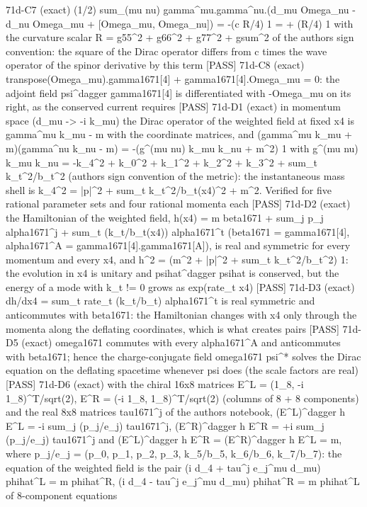 \documentclass[
  10pt,
]{article}
\newenvironment{Shaded}{}{}
\newcommand{\NormalTok}[1]{#1}
\begin{document}
\begin{Shaded}
\begin{Highlighting}[]
\NormalTok{[PASS] 71d{-}C7  (exact) (1/2) sum\_(mu nu) gamma\^{}mu.gamma\^{}nu.(d\_mu Omega\_nu {-} d\_nu Omega\_mu + [Omega\_mu, Omega\_nu]) = {-}(c R/4) 1 = + (R/4) 1 with the curvature scalar R = g55\^{}2 + g66\^{}2 + g77\^{}2 + gsum\^{}2 of the author\textquotesingle{}s sign convention: the square of the Dirac operator differs from c times the wave operator of the spinor derivative by this term}
\NormalTok{[PASS] 71d{-}C8  (exact) transpose(Omega\_mu).gamma1671[4] + gamma1671[4].Omega\_mu = 0: the adjoint field psi\^{}dagger gamma1671[4] is differentiated with {-}Omega\_mu on its right, as the conserved current requires}
\NormalTok{[PASS] 71d{-}D1  (exact) in momentum space (d\_mu {-}\textgreater{} {-}i k\_mu) the Dirac operator of the weighted field at fixed x4 is gamma\^{}mu k\_mu {-} m with the coordinate matrices, and (gamma\^{}mu k\_mu + m)(gamma\^{}nu k\_nu {-} m) = {-}(g\^{}(mu nu) k\_mu k\_nu + m\^{}2) 1 with g\^{}(mu nu) k\_mu k\_nu = {-}k\_4\^{}2 + k\_0\^{}2 + k\_1\^{}2 + k\_2\^{}2 + k\_3\^{}2 + sum\_t k\_t\^{}2/b\_t\^{}2 (author\textquotesingle{}s sign convention of the metric): the instantaneous mass shell is k\_4\^{}2 = |p|\^{}2 + sum\_t k\_t\^{}2/b\_t(x4)\^{}2 + m\^{}2. Verified for five rational parameter sets and four rational momenta each}
\NormalTok{[PASS] 71d{-}D2  (exact) the Hamiltonian of the weighted field, h(x4) = m beta1671 + sum\_j p\_j alpha1671\^{}j + sum\_t (k\_t/b\_t(x4)) alpha1671\^{}t (beta1671 = gamma1671[4], alpha1671\^{}A = gamma1671[4].gamma1671[A]), is real and symmetric for every momentum and every x4, and h\^{}2 = (m\^{}2 + |p|\^{}2 + sum\_t k\_t\^{}2/b\_t\^{}2) 1: the evolution in x4 is unitary and psihat\^{}dagger psihat is conserved, but the energy of a mode with k\_t != 0 grows as exp(rate\_t x4)}
\NormalTok{[PASS] 71d{-}D3  (exact) dh/dx4 = sum\_t rate\_t (k\_t/b\_t) alpha1671\^{}t is real symmetric and anticommutes with beta1671: the Hamiltonian changes with x4 only through the momenta along the deflating coordinates, which is what creates pairs}
\NormalTok{[PASS] 71d{-}D5  (exact) omega1671 commutes with every alpha1671\^{}A and anticommutes with beta1671; hence the charge{-}conjugate field omega1671 psi\^{}* solves the Dirac equation on the deflating spacetime whenever psi does (the scale factors are real)}
\NormalTok{[PASS] 71d{-}D6  (exact) with the chiral 16x8 matrices E\^{}L = (1\_8, {-}i 1\_8)\^{}T/sqrt(2), E\^{}R = ({-}i 1\_8, 1\_8)\^{}T/sqrt(2) (columns of 8 + 8 components) and the real 8x8 matrices tau1671\^{}j of the author\textquotesingle{}s notebook, (E\^{}L)\^{}dagger h E\^{}L = {-}i sum\_j (p\_j/e\_j) tau1671\^{}j, (E\^{}R)\^{}dagger h E\^{}R = +i sum\_j (p\_j/e\_j) tau1671\^{}j and (E\^{}L)\^{}dagger h E\^{}R = (E\^{}R)\^{}dagger h E\^{}L = m, where p\_j/e\_j = (p\_0, p\_1, p\_2, p\_3, k\_5/b\_5, k\_6/b\_6, k\_7/b\_7): the equation of the weighted field is the pair (i d\_4 + tau\^{}j e\_j\^{}mu d\_mu) phihat\^{}L = m phihat\^{}R, (i d\_4 {-} tau\^{}j e\_j\^{}mu d\_mu) phihat\^{}R = m phihat\^{}L of 8{-}component equations}

\end{Highlighting}
\end{Shaded}
\end{document}
